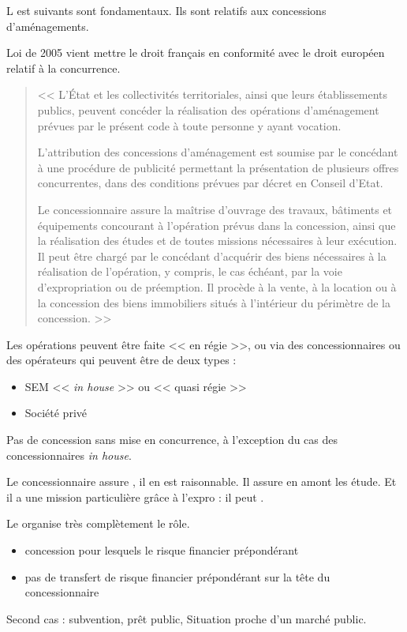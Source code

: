 	L est suivants sont fondamentaux. Ils sont relatifs aux concessions d'aménagements.

	Loi de 2005 vient mettre le droit français en conformité avec le droit européen relatif à la concurrence.

	\begin{quote}
		\textbf{}

		<< {\itshape } L'État et les collectivités territoriales, ainsi que leurs établissements publics, peuvent concéder la réalisation des opérations d'aménagement prévues par le présent code à toute personne y ayant vocation.

		\medskip L'attribution des concessions d'aménagement est soumise par le concédant à une procédure de publicité permettant la présentation de plusieurs offres concurrentes, dans des conditions prévues par décret en Conseil d'Etat. \lips

		\medskip Le concessionnaire assure la maîtrise d'ouvrage des travaux, bâtiments et équipements concourant à l'opération prévus dans la concession, ainsi que la réalisation des études et de toutes missions nécessaires à leur exécution. Il peut être chargé par le concédant d'acquérir des biens nécessaires à la réalisation de l'opération, y compris, le cas échéant, par la voie d'expropriation ou de préemption. Il procède à la vente, à la location ou à la concession des biens immobiliers situés à l'intérieur du périmètre de la concession.  >>
	\end{quote}

	Les opérations peuvent être faite << en régie >>, ou via des concessionnaires ou des opérateurs qui peuvent être de deux types :
	\begin{itemize}
		\item SEM << \emph{in house} >> ou << quasi régie >>
		\item Société privé
	\end{itemize}
	Pas de concession sans mise en concurrence, à l'exception du cas des concessionnaires \emph{in house}.

	Le concessionnaire assure , il en est raisonnable. Il assure en amont les étude. Et il a une mission particulière grâce à l'expro : il peut .

	Le \cu organise très complètement le rôle.

	\begin{itemize}
		\item {} concession pour lesquels le risque financier prépondérant
		\item {} pas de transfert de risque financier prépondérant sur la tête du concessionnaire
	\end{itemize}
	Second cas : subvention, prêt public, \etc Situation proche d'un marché public.

